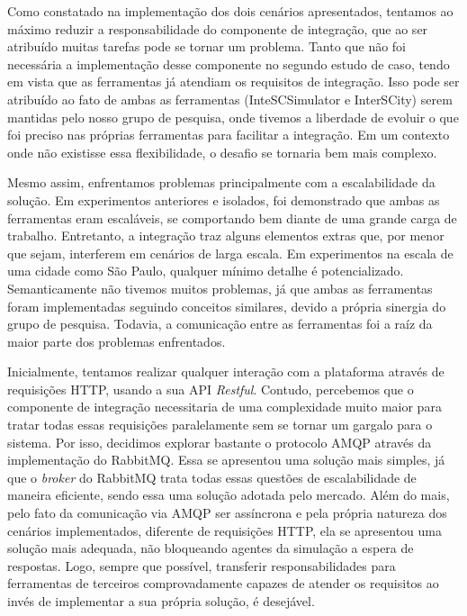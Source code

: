 Como constatado na implementação dos dois cenários apresentados, tentamos ao máximo reduzir a responsabilidade do componente de integração, que ao ser atribuído muitas
tarefas pode se tornar um problema.
Tanto que não foi necessária a implementação desse componente no segundo estudo de caso, tendo em vista que as ferramentas já atendiam os requisitos de integração.
Isso pode ser atribuído ao fato de ambas as ferramentas (InteSCSimulator e InterSCity) serem mantidas pelo nosso grupo de pesquisa, onde tivemos a liberdade de evoluir o
que foi preciso nas próprias ferramentas para facilitar a integração.
Em um contexto onde não existisse essa flexibilidade, o desafio se tornaria bem mais complexo.

Mesmo assim, enfrentamos problemas principalmente com a escalabilidade da solução.
Em experimentos anteriores e isolados, foi demonstrado que ambas as ferramentas eram escaláveis, se comportando bem diante de uma grande carga de trabalho.
Entretanto, a integração traz alguns elementos extras que, por menor que sejam, interferem em cenários de larga escala.
Em experimentos na escala de uma cidade como São Paulo, qualquer mínimo detalhe é potencializado.
Semanticamente não tivemos muitos problemas, já que ambas as ferramentas foram implementadas seguindo conceitos similares, devido a própria sinergia do grupo de
pesquisa.
Todavia, a comunicação entre as ferramentas foi a raíz da maior parte dos problemas enfrentados.

Inicialmente, tentamos realizar qualquer interação com a plataforma através de requisições HTTP, usando a sua API \textit{Restful}.
Contudo, percebemos que o componente de integração necessitaria de uma complexidade muito maior para tratar todas essas requisições paralelamente sem se tornar um
gargalo para o sistema.
Por isso, decidimos explorar bastante o protocolo AMQP através da implementação do RabbitMQ.
Essa se apresentou uma solução mais simples, já que o \textit{broker} do RabbitMQ trata todas essas questões de escalabilidade de maneira eficiente, sendo essa
uma solução adotada pelo mercado.
Além do mais, pelo fato da comunicação via AMQP ser assíncrona e pela própria natureza dos cenários implementados, diferente de requisições HTTP, ela se apresentou uma
solução mais adequada, não bloqueando agentes da simulação a espera de respostas.
Logo, sempre que possível, transferir responsabilidades para ferramentas de terceiros comprovadamente capazes de atender os requisitos ao invés de implementar a sua
própria solução, é desejável.

